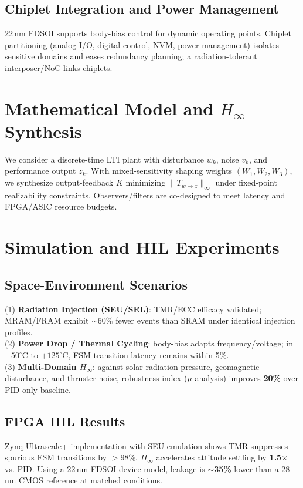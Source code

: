 \documentclass[conference]{IEEEtran}
\begin{document}
\subsection{Chiplet Integration and Power Management}
22\,nm FDSOI supports body-bias control for dynamic operating points. Chiplet partitioning
(analog I/O, digital control, NVM, power management) isolates sensitive domains and
eases redundancy planning; a radiation-tolerant interposer/NoC links chiplets.

\section{Mathematical Model and $H_\infty$ Synthesis}
We consider a discrete-time LTI plant with disturbance $w_k$, noise $v_k$, and performance
output $z_k$. With mixed-sensitivity shaping weights $(W_1,W_2,W_3)$, we synthesize
output-feedback $K$ minimizing $\|T_{w\to z}\|_\infty$ under fixed-point realizability
constraints. Observers/filters are co-designed to meet latency and FPGA/ASIC resource
budgets.

\section{Simulation and HIL Experiments}
\subsection{Space-Environment Scenarios}
(1) \textbf{Radiation Injection (SEU/SEL)}: TMR/ECC efficacy validated; MRAM/FRAM exhibit
$\sim$60\% fewer events than SRAM under identical injection profiles.\\
(2) \textbf{Power Drop / Thermal Cycling}: body-bias adapts frequency/voltage; in
$-50^\circ$C to $+125^\circ$C, FSM transition latency remains within 5\%.\\
(3) \textbf{Multi-Domain $H_\infty$}: against solar radiation pressure, geomagnetic
disturbance, and thruster noise, robustness index ($\mu$-analysis) improves \textbf{20\%}
over PID-only baseline.

\subsection{FPGA HIL Results}
Zynq Ultrascale+ implementation with SEU emulation shows TMR suppresses spurious FSM
transitions by $>\!98\%$. $H_\infty$ accelerates attitude settling by \textbf{1.5$\times$}
vs. PID. Using a 22\,nm FDSOI device model, leakage is $\sim$\textbf{35\%} lower than
a 28\,nm CMOS reference at matched conditions.
\end{document}

